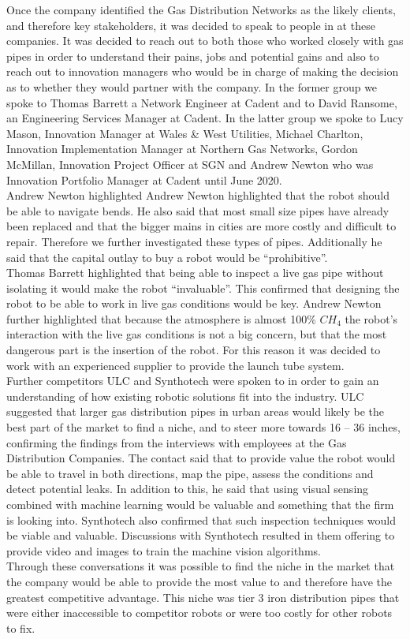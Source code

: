\documentclass[11pt]{article}		%
\begin{document}
	        Once the company identified the Gas Distribution Networks as the likely clients, and therefore key stakeholders, it was decided to speak to people in at these companies. It was decided to reach out to both those who worked closely with gas pipes in order to understand their pains, jobs and potential gains and also to reach out to innovation managers who would be in charge of making the decision as to whether they would partner with the company.
	        In the former group we spoke to Thomas Barrett a Network Engineer at Cadent and to David Ransome, an Engineering Services Manager at Cadent. In the latter group we spoke to Lucy Mason, Innovation Manager at Wales \& West Utilities, Michael Charlton, Innovation Implementation Manager at Northern Gas Networks, Gordon McMillan, Innovation Project Officer at SGN and Andrew Newton who was Innovation Portfolio Manager at Cadent until June 2020.
	        \\
	        Andrew Newton highlighted  Andrew Newton highlighted that the robot should be able to navigate bends. He also said that most small size pipes have already been replaced and that the bigger mains in cities are more costly and difficult to repair. Therefore we further investigated these types of pipes. Additionally he said that the capital outlay to buy a robot would be “prohibitive”. 
	        \\
	        Thomas Barrett highlighted that being able to inspect a live gas pipe without isolating it would make the robot “invaluable”. This confirmed that designing the robot to be able to work in live gas conditions would be key. Andrew Newton further highlighted that because the atmosphere is almost 100\% ${CH}_4$ the robot’s interaction with the live gas conditions is not a big concern, but that the most dangerous part is the insertion of the robot. For this reason it was decided to work with an experienced supplier to provide the launch tube system.
	        \\
	        Further competitors ULC and Synthotech were spoken to in order to gain an understanding of how existing robotic solutions fit into the industry. ULC suggested that larger gas distribution pipes in urban areas would likely be the best part of the market to find a niche, and to steer more towards 16 – 36 inches, confirming the findings from the interviews with employees at the Gas Distribution Companies. The contact said that to provide value the robot would be able to travel in both directions, map the pipe, assess the conditions and detect potential leaks. In addition to this, he said that using visual sensing combined with machine learning would be valuable and something that the firm is looking into. Synthotech also confirmed that such inspection techniques would be viable and valuable. Discussions with Synthotech resulted in them offering to provide video and images to train the machine vision algorithms.
	        \\
	        Through these conversations it was possible to find the niche in the market that the company would be able to provide the most value to and therefore have the greatest competitive advantage. This niche was tier 3 iron distribution pipes that were either inaccessible to competitor robots or were too costly for other robots to fix.
        
\end{document}
